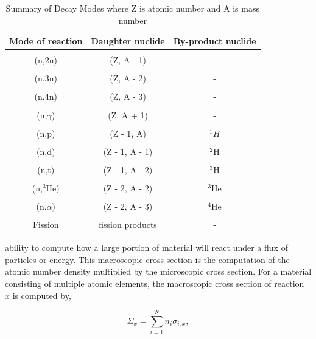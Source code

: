 \begin{table}[p]
    \caption{\label{tab:reactionModes} Summary of Decay Modes where Z is atomic number and A is mass number \cite{pusaThesis}}
    \centering
    \begin{tabular}{c|c|c}
    \hline
    \textbf{Mode of reaction} & \textbf{Daughter nuclide} & \textbf{By-product nuclide} \\ [0.5ex] 
    \hline
    \hline
    \\ [-1em]
    (n,2n) & (Z, A - 1) & - \\ \hline 
    \\ [-1em]
    (n,3n) & (Z, A - 2) & - \\ \hline 
    \\ [-1em]
    (n,4n) & (Z, A - 3) & - \\ \hline 
    \\ [-1em]
    (n,$\gamma$) & (Z, A + 1) & - \\ \hline 
    \\ [-1em]
    (n,p) & (Z - 1, A) & ${}^{1}H$ \\ \hline 
    \\ [-1em]
    (n,d) & (Z - 1, A - 1) & ${}^{2}$H \\ \hline 
    \\ [-1em]
    (n,t) & (Z - 1, A - 2) & ${}^{3}$H \\ \hline 
    \\ [-1em]
    (n,${}^{3}$He) & (Z - 2, A - 2) & ${}^{3}$He \\ \hline 
    \\ [-1em]
    (n,$\alpha$) & (Z - 2, A - 3) & ${}^{4}$He \\ \hline 
    \\ [-1em]
    Fission & fission products & - \\ \hline
    \end{tabular}
\end{table}

\clearpage

\noindent ability to compute how a large portion of material will react under a flux of particles or energy. This macroscopic cross section is the computation of the atomic number density multiplied by the microscopic cross section. For a material consisting of multiple atomic elements, the macroscopic cross section of reaction $x$ is computed by,

\begin{equation}
    \Sigma_{x} = \sum_{i=1}^{N}n_{i}\sigma_{i,x},
\end{equation}


